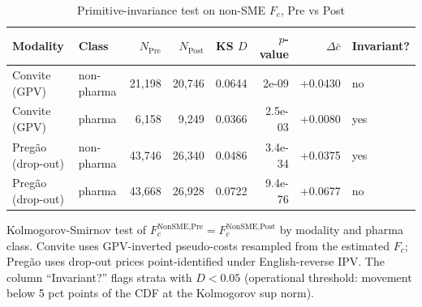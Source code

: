 \begin{table}[htbp]
\centering
\begin{threeparttable}
\caption{Primitive-invariance test on non-SME $F_c$, Pre vs Post}
\label{tab:v3_primitive_invariance}
\small
\begin{tabular}{llrrrrrl}
\toprule
Modality & Class & $N_{\text{Pre}}$ & $N_{\text{Post}}$ & KS $D$ & $p$-value & $\Delta\bar{c}$ & Invariant? \\
\midrule
Convite (GPV) & non-pharma & 21,198 & 20,746 & 0.0644 & 2e-09 & +0.0430 & no \\
Convite (GPV) & pharma & 6,158 & 9,249 & 0.0366 & 2.5e-03 & +0.0080 & yes \\
Pregão (drop-out) & non-pharma & 43,746 & 26,340 & 0.0486 & 3.4e-34 & +0.0375 & yes \\
Pregão (drop-out) & pharma & 43,668 & 26,928 & 0.0722 & 9.4e-76 & +0.0677 & no \\
\bottomrule
\end{tabular}
\begin{tablenotes}\footnotesize
\item Kolmogorov-Smirnov test of $F_c^{\text{NonSME},\text{Pre}} =
F_c^{\text{NonSME},\text{Post}}$ by modality and pharma class.
Convite uses GPV-inverted pseudo-costs resampled from the estimated
$F_c$; Preg\~ao uses drop-out prices point-identified under
English-reverse IPV. The column ``Invariant?'' flags strata with
$D < 0.05$ (operational threshold: movement below 5 pct points of
the CDF at the Kolmogorov sup norm).
\end{tablenotes}
\end{threeparttable}
\end{table}
